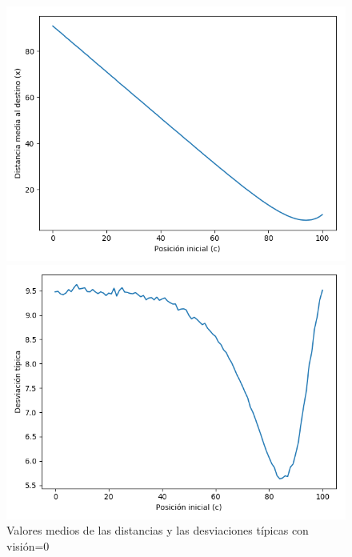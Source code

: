 \documentclass[11pt,a4paper]{report}
\begin{document}
\begin{figure}[H]
\centering
	\begin{minipage}{0.5\textwidth}
	  \centering
	  \includegraphics[scale=0.4]{img/x-100-0-90.png}
	\end{minipage}%
	\begin{minipage}{0.5\textwidth}
	  \centering
	  \includegraphics[scale=0.4]{img/dt-100-0-90.png}
	\end{minipage}
\caption{Valores medios de las distancias y las desviaciones típicas con visión=0}
\end{figure}
\end{document}
